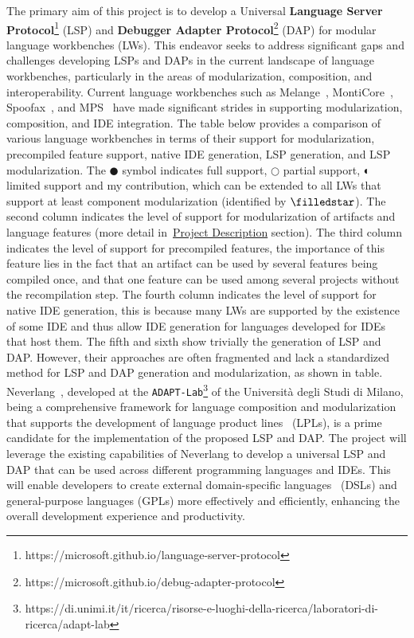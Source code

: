 The primary aim of this project is to develop a Universal \textbf{Language Server Protocol}\footnote{https://microsoft.github.io/language-server-protocol} (LSP) and \textbf{Debugger Adapter Protocol}\footnote{https://microsoft.github.io/debug-adapter-protocol} (DAP) for modular language workbenches (LWs). This endeavor seeks to address significant gaps and challenges developing LSPs and DAPs in the current landscape of language workbenches, particularly in the areas of modularization, composition, and interoperability. Current language workbenches such as Melange~\cite{Degueule15}, MontiCore~\cite{Krahn10}, Spoofax~\cite{Visser10}, and MPS~\cite{Volter11, Voelter12} have made significant strides in supporting modularization, composition, and IDE integration.
The table below provides a comparison of various language workbenches in terms of their support for modularization, precompiled feature support, native IDE generation, LSP generation, and LSP modularization. The $\CIRCLE$ symbol indicates full support, $\Circle$ partial support, $\LEFTcircle$ limited support and \FiveStarConvex my contribution, which can be extended to all LWs that support at least component modularization (identified by $\filledstar$).
The second column indicates the level of support for modularization of artifacts and language features (more detail in~\hyperref[project-description]{Project Description} section). The third column indicates the level of support for precompiled features, the importance of this feature lies in the fact that an artifact can be used by several features being compiled once, and that one feature can be used among several projects without the recompilation step.  The fourth column indicates the level of support for native IDE generation, this is because many LWs are supported by the existence of some IDE and thus allow IDE generation for languages developed for IDEs that host them.
The fifth and sixth show trivially the generation of LSP and DAP.
However, their approaches are often fragmented and lack a standardized method for LSP and DAP generation and modularization, as shown in table.
Neverlang~\cite{Cazzola15c, Cazzola14c}, developed at the \texttt{ADAPT-Lab}\footnote{https://di.unimi.it/it/ricerca/risorse-e-luoghi-della-ricerca/laboratori-di-ricerca/adapt-lab} of the Università degli Studi di Milano, being a comprehensive framework for language composition and modularization that supports the development of language product lines~\cite{Cazzola15f, Cazzola21b} (LPLs), is a prime candidate for the implementation of the proposed LSP and DAP. The project will leverage the existing capabilities of Neverlang to develop a universal LSP and DAP that can be used across different programming languages and IDEs. This will enable developers to create external domain-specific languages~\cite{Fowler10} (DSLs) and general-purpose languages (GPLs) more effectively and efficiently, enhancing the overall development experience and productivity.

